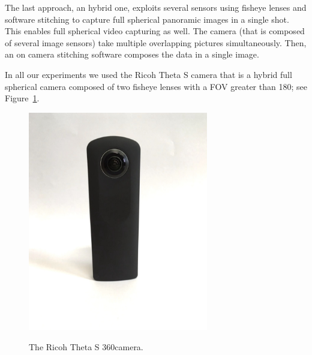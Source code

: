 The last approach, an hybrid one, exploits several sensors using fisheye lenses and software stitching to capture full spherical panoramic images in a single shot. This enables full spherical video capturing as well. The camera (that is composed of several image sensors) take multiple overlapping pictures simultaneously. Then, an on camera stitching software composes the data in a single image.

In all our experiments we used the Ricoh Theta S camera that is a hybrid full spherical camera 
composed of two fisheye lenses with a FOV greater than 180\degree; see Figure~\ref{fig:ricoh_theta}.

\begin{figure}
\centering
\includegraphics[width=0.7\textwidth]{img/theta1}
\label{fig:ricoh_theta}
\caption{The Ricoh Theta S 360\degree camera.}
\end{figure}
